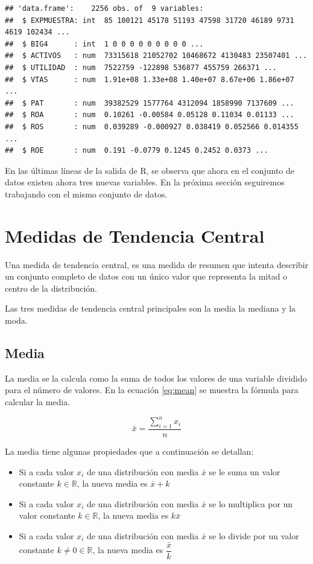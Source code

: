 \documentclass[]{book}
\providecommand{\tightlist}{%
  \setlength{\itemsep}{0pt}\setlength{\parskip}{0pt}}
\begin{document}
\begin{verbatim}
## 'data.frame':    2256 obs. of  9 variables:
##  $ EXPMUESTRA: int  85 100121 45178 51193 47598 31720 46189 9731 4619 102434 ...
##  $ BIG4      : int  1 0 0 0 0 0 0 0 0 0 ...
##  $ ACTIVOS   : num  73315618 21052702 10468672 4130483 23507401 ...
##  $ UTILIDAD  : num  7522759 -122898 536877 455759 266371 ...
##  $ VTAS      : num  1.91e+08 1.33e+08 1.40e+07 8.67e+06 1.86e+07 ...
##  $ PAT       : num  39382529 1577764 4312094 1858990 7137609 ...
##  $ ROA       : num  0.10261 -0.00584 0.05128 0.11034 0.01133 ...
##  $ ROS       : num  0.039289 -0.000927 0.038419 0.052566 0.014355 ...
##  $ ROE       : num  0.191 -0.0779 0.1245 0.2452 0.0373 ...
\end{verbatim}

En las últimas líneas de la salida de R, se observa que ahora en el
conjunto de datos existen ahora tres nuevas variables. En la próxima
sección seguiremos trabajando con el mismo conjunto de datos.

\section{Medidas de Tendencia
Central}\label{medidas-de-tendencia-central}

Una medida de tendencia central, es una medida de resumen que intenta
describir un conjunto completo de datos con un único valor que
representa la mitad o centro de la distribución.

Las tres medidas de tendencia central principales son la media la
mediana y la moda.

\subsection{Media}\label{media}

La media se la calcula como la suma de todos los valores de una variable
dividido para el número de valores. En la ecuación \eqref{eq:mean} se
muestra la fórmula para calcular la media.

\begin{equation} 
  \bar{x} = \dfrac{\sum_{i=1}^{n}x_i}{n}
  \label{eq:mean}
\end{equation}

La media tiene algunas propiedades que a continuación se detallan:

\begin{itemize}
\tightlist
\item
  Si a cada valor \(x_i\) de una distribución con media \(\bar{x}\) se
  le suma un valor constante \(k \in \mathbb{R}\), la nueva media es
  \(\bar{x}+k\)
\item
  Si a cada valor \(x_i\) de una distribución con media \(\bar{x}\) se
  lo multiplica por un valor constante \(k \in \mathbb{R}\), la nueva
  media es \(k\bar{x}\)
\item
  Si a cada valor \(x_i\) de una distribución con media \(\bar{x}\) se
  lo divide por un valor constante \(k \neq 0 \in \mathbb{R}\), la nueva
  media es \(\dfrac{\bar{x}}{k}\)
\end{itemize}
\end{document}
